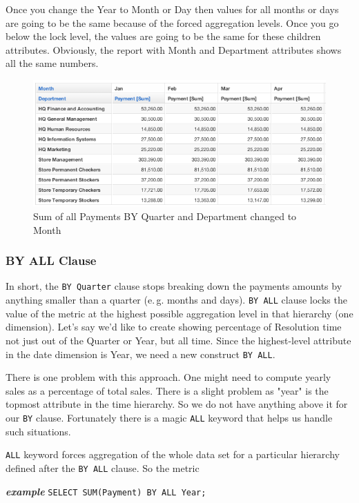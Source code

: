 \documentclass[a4paper, 12pt, titlepage, fleqn]{article}
\begin{document}
Once you change the Year to Month or Day then values for all months or days are going to be the same because of the forced aggregation levels. Once you go below the lock level, the values are going to be the same for these children attributes. Obviously, the report with Month and Department attributes shows all the same numbers.

\begin{figure}[htb]
\centering
\includegraphics[scale=0.6]{images/qDepM.png}
\caption{Sum of all Payments BY Quarter and Department changed to Month}
\label{fig:qDepM}
\end{figure}

\subsubsection{BY ALL Clause}
In short, the \verb=BY Quarter= clause stops breaking down the payments amounts by anything smaller than a quarter (e.\,g. months and days). \verb=BY ALL= clause locks the value of the metric at the highest possible aggregation level in that hierarchy (one dimension). Let's say we'd like to create showing percentage of Resolution time not just out of the Quarter or Year, but all time. Since the highest-level attribute in the date dimension is Year, we need a new construct \verb=BY ALL=.

There is one problem with this approach. One might need to compute yearly sales as a percentage of total sales. There is a slight problem as "year" is the topmost attribute in the time hierarchy. So we do not have anything above it for our \verb=BY= clause. Fortunately there is a magic \verb=ALL= keyword that helps us handle such situations. 

\verb=ALL= keyword forces aggregation of the whole data set for a particular hierarchy defined after the \verb=BY ALL= clause. So the metric

\textbf{\emph{example}}  \hspace{.9cm}\verb=SELECT SUM(Payment) BY ALL Year;=
\end{document}
